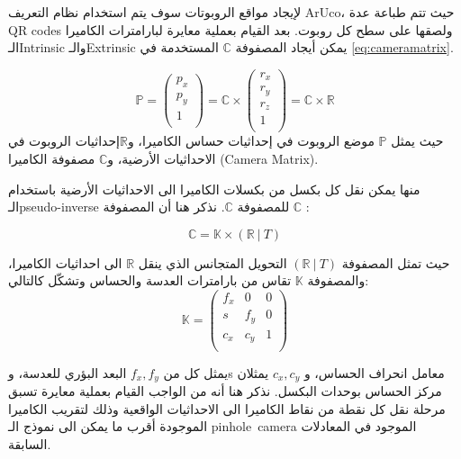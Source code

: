 لإيجاد مواقع الروبوتات سوف يتم استخدام نظام التعريف ArUco، حيث تتم طباعة عدة QR codes ولصقها على سطح كل روبوت. بعد القيام بعملية معايرة لبارامترات الكاميرا الـIntrinsic والـExtrinsic يمكن أيجاد المصفوفة $ \mathbb{C} $ المستخدمة في \ref{eq:cameramatrix}.

\begin{equation}\label{eq:cameramatrix}
\mathbb{P}=\left(\begin{matrix}p_x\\p_y\\1\\\end{matrix}\right)=\mathbb{C}\times\left(\begin{matrix}r_x\\r_y\\r_z\\1\\\end{matrix}\right)=\mathbb{C}\times\mathbb{R}
\end{equation}
حيث يمثل $ \mathbb{P} $ موضع الروبوت في إحداثيات حساس الكاميرا، و$ \mathbb{R}  $إحداثيات الروبوت في الاحداثيات الأرضية، و$  \mathbb{C}  $ مصفوفة الكاميرا (Camera Matrix).


منها يمكن نقل كل بكسل من بكسلات الكاميرا الى الاحداثيات الأرضية باستخدام الـpseudo-inverse للمصفوفة $\mathbb{C}$. نذكر هنا أن المصفوفة $ \mathbb{C} $ :

\begin{equation}
\mathbb{C}=\mathbb{K}\times\left(\mathbb{R}\ |\ {T}\right)
\end{equation}

حيث تمثل المصفوفة $ \left(\mathbb{R}\ |\ {T}\right)  $ التحويل المتجانس الذي ينقل $ \mathbb{R}  $ الى احداثيات الكاميرا، والمصفوفة $ \mathbb{K}  $ تقاس من بارامترات العدسة والحساس وتشكّل كالتالي:
\begin{equation}
\mathbb{K}=\left(\begin{matrix}f_x&0&0\\s&f_y&0\\c_x&c_y&1\\\end{matrix}\right)
\end{equation}

يمثل كل من $ f_x, f_y $ البعد البؤري للعدسة، وs معامل انحراف الحساس، و $c_x, c_y$ يمثلان مركز الحساس بوحدات البكسل.
نذكر هنا أنه من الواجب القيام بعملية معايرة تسبق مرحلة نقل كل نقطة من نقاط الكاميرا الى الاحداثيات الواقعية وذلك لتقريب الكاميرا الموجودة أقرب ما يمكن الى نموذج الـ pinhole\ camera الموجود في المعادلات السابقة.


